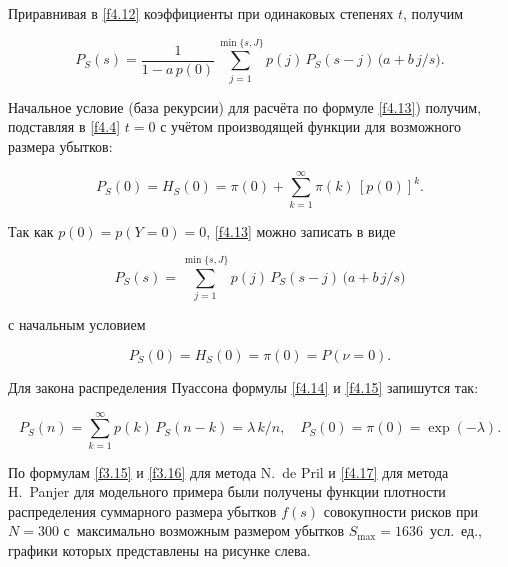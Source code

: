 Приравнивая в \eqref{f4.12} коэффициенты при одинаковых степенях $t$, получим

\begin{equation}

\label{f4.13}

P_S(s) = \frac{1}{1-a\, p(0)} \sum_{j=1}^{\min\{s, J\}} p(j) \, P_S(s-j)\, \bigl(a+{b\,j}/{s}\bigr).

\end{equation}



Начальное условие (база рекурсии) для расчёта по формуле \eqref{f4.13}) получим,  подставляя в \eqref{f4.4} $t=0$ с учётом производящей функции для возможного размера убытков:

$$P_S(0) =H_S(0)=\pi(0) + \sum_{k=1}^\infty \pi(k) \, [p(0)]^k.$$

Так как  $p(0)=p(Y=0)=0$, \eqref{f4.13} можно записать в виде

\begin{equation}

\label{f4.14}

P_S(s)= \sum_{j=1}^{\min\{s,J\}} p(j)\, P_S(s-j)\, \bigl(a+{b\, j}/{s}\bigr)

\end{equation}

с начальным условием

\begin{equation}

\label{f4.15}

P_S(0)= H_S(0) = \pi(0)=P(\nu=0).

\end{equation}



Для закона распределения Пуассона формулы \eqref{f4.14} и \eqref{f4.15} запишутся так:

\begin{equation}

\label{f4.17}

P_S(n)=\sum_{k=1}^{\infty} p(k) \, P_S(n-k) = \lambda \, k/{n}, \quad P_S(0)=\pi(0) = \exp({-\lambda}).

\end{equation}





\smallskip

 По формулам \eqref{f3.15} и \eqref{f3.16} для метода N.~de Pril и \eqref{f4.17} для метода H.~Panjer для модельного примера  были получены функции плотности распределения  суммарного размера убытков $f(s)$ совокупности рисков при $N=300$ с~максимально возможным размером убытков $S_{\max}=1636$~усл.~ед., графики которых представлены на рисунке слева.



